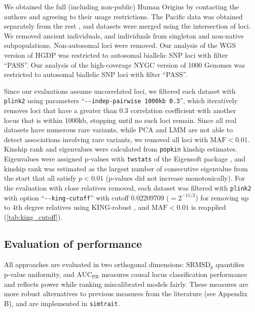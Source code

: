 \documentclass[11pt]{article}
\newcommand{\rmsd}{\text{SRMSD}_p}
\newcommand{\auc}{\text{AUC}_\text{PR}}
\begin{document}
We obtained the full (including non-public) Human Origins by contacting the authors and agreeing to their usage restrictions.
The Pacific data \citep{skoglund_genomic_2016} was obtained separately from the rest \citep{lazaridis_ancient_2014,lazaridis_genomic_2016}, and datasets were merged using the intersection of loci.
We removed ancient individuals, and individuals from singleton and non-native subpopulations.
Non-autosomal loci were removed.
Our analysis of the WGS version of HGDP \citep{bergstrom_insights_2020} was restricted to autosomal biallelic SNP loci with filter ``PASS''.
Our analysis of the high-coverage NYGC version of 1000 Genomes \citep{fairley_international_2020} was restricted to autosomal biallelic SNP loci with filter ``PASS''.

Since our evaluations assume uncorrelated loci, we filtered each dataset with \texttt{plink2} using parameters ``\texttt{-{}-indep-pairwise 1000kb 0.3}'', which iteratively removes loci that have a greater than 0.3 correlation coefficient with another locus that is within 1000kb, stopping until no such loci remain.
Since all real datasets have numerous rare variants, while PCA and LMM are not able to detect associations involving rare variants, we removed all loci with $\text{MAF} < 0.01$.
Kinship rank and eigenvalues were calculated from \texttt{popkin} kinship estimates.
Eigenvalues were assigned p-values with \texttt{twstats} of the Eigensoft package \citep{patterson_population_2006}, and kinship rank was estimated as the largest number of consecutive eigenvalue from the start that all satisfy $p < 0.01$ (p-values did not increase monotonically).
For the evaluation with close relatives removed, each dataset was filtered with \texttt{plink2} with option ``\texttt{-{}-king-cutoff}'' with cutoff 0.02209709 ($= 2^{-11/2}$) for removing up to 4th degree relatives using KING-robust \citep{manichaikul_robust_2010}, and $\text{MAF} < 0.01$ is reapplied (\cref{tab:king_cutoff}).

\subsection{Evaluation of performance}

All approaches are evaluated in two orthogonal dimensions: $\rmsd$ quantifies p-value uniformity, and $\auc$ measures causal locus classification performance and reflects power while ranking miscalibrated models fairly.
These measures are more robust alternatives to previous measures from the literature (see Appendix B), and are implemented in \texttt{simtrait}.
\end{document}
